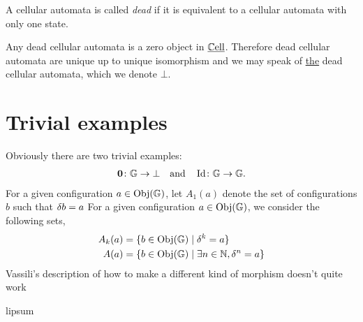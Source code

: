 \message{ !name(cell-cat.tex)}\documentclass[11pt,a4paper]{amsart}
\begin{document}
\begin{DEF}
  \label{def:dead-automata}
  A cellular automata is called \emph{dead} if it is equivalent to a cellular automata with only one state. 
\end{DEF}

\begin{PROP}
  \label{prop:dead-zero}
  Any dead cellular automata is a zero object in $\operatorname{\underline{\mathbb{C}ell}}$.  Therefore dead cellular automata are unique up to unique isomorphism and we may speak of \href{https://ncatlab.org/nlab/show/generalized+the}{the} dead cellular automata, which we denote $\bot$.
\end{PROP}


\section{Trivial examples}

Obviously there are two  trivial examples: 
\begin{align*}
  \textbf{0} \colon \mathbb{G} \to \bot \quad \text{and} \quad \operatorname{Id} \colon \mathbb{G} \to \mathbb{G}. 
\end{align*}
For a given configuration $a \in \operatorname{Obj}(\mathbb{G})$, let $A_1(a)$ denote the set of configurations $b$ such that $\delta{b}=a$
For a given configuration $a \in \operatorname{Obj}(\mathbb{G})$, we consider the following sets,
\begin{align*}
A_k(a) &= \{b \in \operatorname{Obj}(\mathbb{G}) \mid \delta^k = a\} \\ A(a) &= \{b \in \operatorname{Obj}(\mathbb{G}) \mid \exists n \in \mathbb{N}, \delta^n = a\}
\end{align*}
Vassili's description of how to make a different kind of morphism doesn't quite work 

\begin{REM}
  \label{rem:change-cat}
  lipsum
\end{REM}
\end{document}
